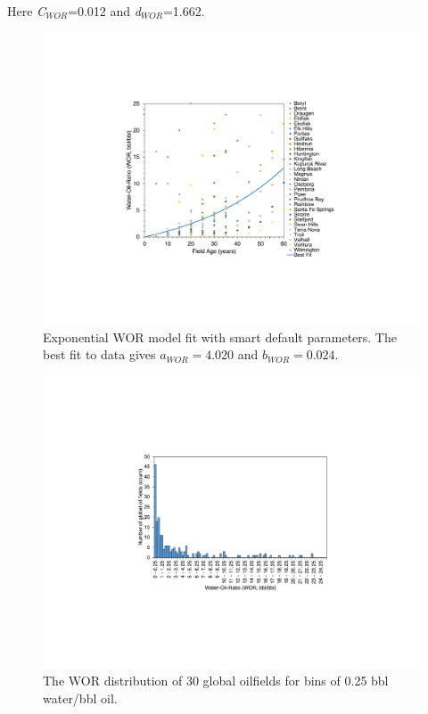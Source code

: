\documentclass[11pt]{report}
\begin{document}
Here \emph{C$_{WOR}$}=0.012 and \emph{d$_{WOR}$}=1.662. 

\begin{figure}
\includegraphics[width=1\columnwidth]{images/WOR_plot.pdf}
\caption{Exponential WOR model fit with smart default parameters. The best fit to data gives $a_{WOR} = 4.020$ and $b_{WOR} = 0.024$.}
\label{fig:exponenital_fit_WOR}
\end{figure}

\begin{figure}
\includegraphics[width=1\columnwidth]{images/WOR_hist.pdf}
\caption{The WOR distribution of 30 global oilfields for bins of 0.25 bbl water/bbl oil.}
\label{fig:WOR_hist}
\end{figure}
\end{document}

